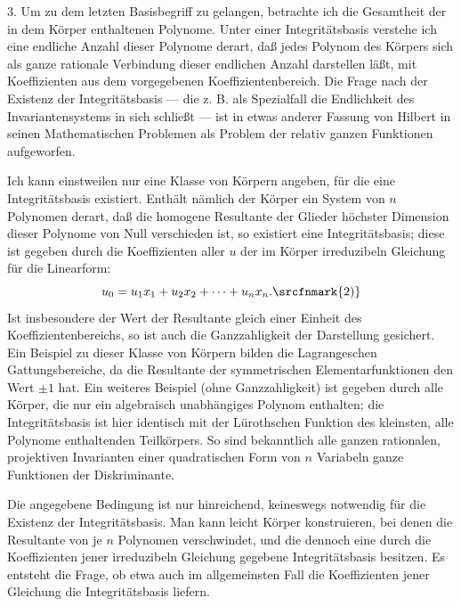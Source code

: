 3. Um zu dem letzten Basisbegriff zu gelangen, betrachte ich die Gesamtheit der in dem Körper enthaltenen Polynome. Unter einer \glqq{}Integritätsbasis\grqq{} verstehe ich eine endliche Anzahl dieser Polynome derart, daß jedes Polynom des Körpers sich als ganze rationale Verbindung dieser endlichen Anzahl darstellen läßt, mit Koeffizienten aus dem vorgegebenen Koeffizientenbereich. Die Frage nach der Existenz der Integritätsbasis --- die z. B. als Spezialfall die Endlichkeit des Invariantensystems in sich schließt --- ist in etwas anderer Fassung von Hilbert in seinen \glqq{}Mathematischen Problemen\grqq{} als Problem der relativ ganzen Funktionen aufgeworfen.

Ich kann einstweilen nur eine Klasse von Körpern angeben, für die eine Integritätsbasis existiert. Enthält nämlich der Körper ein System von $n$ Polynomen derart, daß die homogene Resultante der Glieder höchster Dimension dieser Polynome von Null verschieden ist, so existiert eine Integritätsbasis; diese ist gegeben durch die Koeffizienten aller $u$ der im Körper irreduzibeln Gleichung für die Linearform:
\[
  u_0=u_1x_1+u_2x_2+\cdots+u_nx_n.\srcfnmark{2)}
\]
Ist insbesondere der Wert der Resultante gleich einer Einheit des Koeffizientenbereichs, so ist auch die Ganzzahligkeit der Darstellung gesichert. Ein Beispiel zu dieser Klasse von Körpern bilden die Lagrangeschen Gattungsbereiche, da die Resultante der symmetrischen Elementarfunktionen den Wert $\pm 1$ hat. Ein weiteres Beispiel (ohne Ganzzahligkeit) ist gegeben durch alle Körper, die nur ein algebraisch unabhängiges Polynom enthalten; die Integritätsbasis ist hier identisch mit der Lürothschen Funktion des kleinsten, alle Polynome enthaltenden Teilkörpers. So sind bekanntlich alle ganzen rationalen, projektiven Invarianten einer quadratischen Form von $n$ Variabeln ganze Funktionen der Diskriminante.

Die angegebene Bedingung ist nur hinreichend, keineswegs notwendig für die Existenz der Integritätsbasis. Man kann leicht Körper konstruieren, bei denen die Resultante von je $n$ Polynomen verschwindet, und die dennoch eine durch die Koeffizienten jener irreduzibeln Gleichung gegebene Integritätsbasis besitzen. Es entsteht die Frage, ob etwa auch im allgemeinsten Fall die Koeffizienten jener Gleichung die Integritätsbasis liefern.


